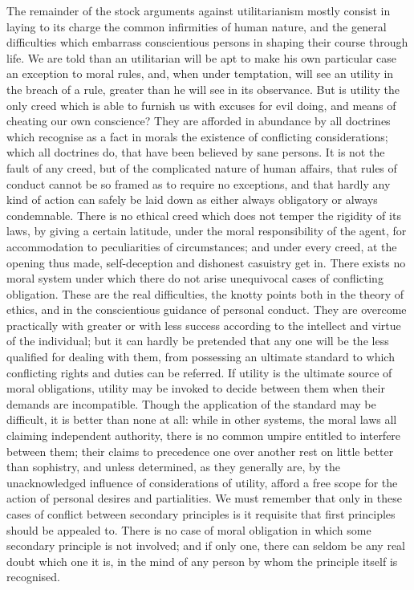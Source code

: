 The remainder of the stock arguments against utilitarianism mostly
consist in laying to its charge the common infirmities of human
nature, and the general difficulties which embarrass conscientious
 persons in shaping their course through life. We are told
than an utilitarian will be apt to make his own particular case an
exception to moral rules, and, when under temptation, will see an
utility in the breach of a rule, greater than he will see in its
observance. But is utility the only creed which is able to furnish us
with excuses for evil doing, and means of cheating our own conscience?
They are afforded in abundance by all doctrines which recognise as a
fact in morals the existence of conflicting considerations; which all
doctrines do, that have been believed by sane persons. It is not the
fault of any creed, but of the complicated nature of human affairs,
that rules of conduct cannot be so framed as to require no exceptions,
and that hardly any kind of action can safely be laid down as either
always obligatory or always condemnable. There is no ethical creed
which does not temper the rigidity of its laws, by giving a certain
latitude, under the moral responsibility of the agent, for
accommodation to peculiarities of circumstances; and under every
creed, at the opening thus made, self-deception and dishonest
casuistry get in. There exists no moral system under which there do
not arise unequivocal cases of conflicting obligation. These are the
real difficulties, the knotty points both in the theory of ethics, and
in the conscientious guidance of personal conduct. They are overcome
practically with greater or with less success according to the
intellect and virtue of the individual; but it can hardly be pretended
that any one will be the less qualified for dealing with them, from
possessing an ultimate standard to which conflicting rights and duties
can be referred. If utility is the ultimate source of moral 
obligations, utility may be invoked to decide between them when their
demands are incompatible. Though the application of the standard may
be difficult, it is better than none at all: while in other systems,
the moral laws all claiming independent authority, there is no common
umpire entitled to interfere between them; their claims to precedence
one over another rest on little better than sophistry, and unless
determined, as they generally are, by the unacknowledged influence of
considerations of utility, afford a free scope for the action of
personal desires and partialities. We must remember that only in
these cases of conflict between secondary principles is it requisite
that first principles should be appealed to. There is no case of moral
obligation in which some secondary principle is not involved; and if
only one, there can seldom be any real doubt which one it is, in the
mind of any person by whom the principle itself is recognised.

